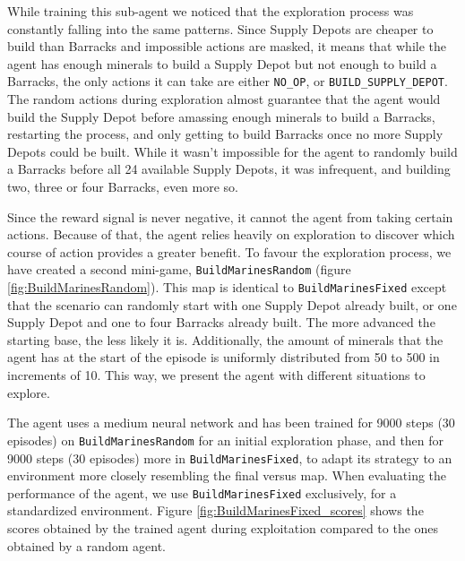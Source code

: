 While training this sub-agent we noticed that the exploration process was constantly falling into the same patterns. Since Supply Depots are cheaper to build than Barracks and impossible actions are masked, it means that while the agent has enough minerals to build a Supply Depot but not enough to build a Barracks, the only actions it can take are either \texttt{NO\_OP}, or \texttt{BUILD\_SUPPLY\_DEPOT}. The random actions during exploration almost guarantee that the agent would build the Supply Depot before amassing enough minerals to build a Barracks, restarting the process, and only getting to build Barracks once no more Supply Depots could be built. While it wasn't impossible for the agent to randomly build a Barracks before all 24 available Supply Depots, it was infrequent, and building two, three or four Barracks, even more so.

Since the reward signal is never negative, it cannot  the agent from taking certain actions. Because of that, the agent relies heavily on exploration to discover which course of action provides a greater benefit. To favour the exploration process, we have created a second mini-game, \texttt{BuildMarinesRandom} (figure \ref{fig:BuildMarinesRandom}). This map is identical to \texttt{BuildMarinesFixed} except that the scenario can randomly start with one Supply Depot already built, or one Supply Depot and one to four Barracks already built. The more advanced the starting base, the less likely it is. Additionally, the amount of minerals that the agent has at the start of the episode is uniformly distributed from 50 to 500 in increments of 10. This way, we present the agent with different situations to explore.

The agent uses a medium neural network and has been trained for 9000 steps (30 episodes) on \texttt{BuildMarinesRandom} for an initial exploration phase, and then for 9000 steps (30 episodes) more in \texttt{BuildMarinesFixed}, to adapt its strategy to an environment more closely resembling the final versus map. When evaluating the performance of the agent, we use \texttt{BuildMarinesFixed} exclusively, for a standardized environment. Figure \ref{fig:BuildMarinesFixed_scores} shows the scores obtained by the trained agent during exploitation compared to the ones obtained by a random agent.

